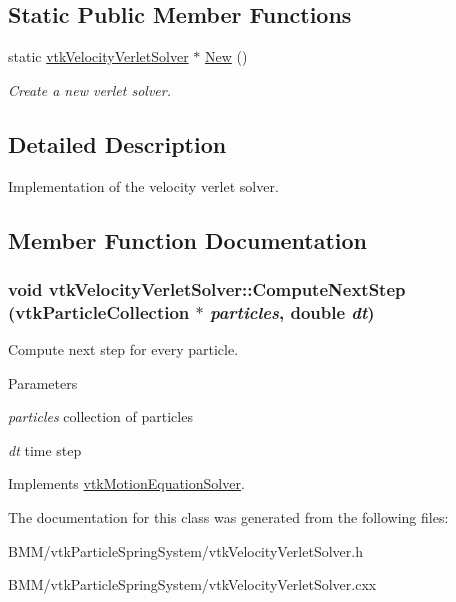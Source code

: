 \subsection*{Static Public Member Functions}
\begin{DoxyCompactItemize}
\item 
\hypertarget{classvtkVelocityVerletSolver_a72150978cba03439b19e4c0f22e43aab}{
static \hyperlink{classvtkVelocityVerletSolver}{vtkVelocityVerletSolver} $\ast$ \hyperlink{classvtkVelocityVerletSolver_a72150978cba03439b19e4c0f22e43aab}{New} ()}
\label{classvtkVelocityVerletSolver_a72150978cba03439b19e4c0f22e43aab}

\begin{DoxyCompactList}\small\item\em Create a new verlet solver. \item\end{DoxyCompactList}\end{DoxyCompactItemize}


\subsection{Detailed Description}
Implementation of the velocity verlet solver. 

\subsection{Member Function Documentation}
\hypertarget{classvtkVelocityVerletSolver_af9c28e67adeab24a3d24e73daa2e40dd}{
\subsubsection[{ComputeNextStep}]{\setlength{\rightskip}{0pt plus 5cm}void vtkVelocityVerletSolver::ComputeNextStep ({\bf vtkParticleCollection} $\ast$ {\em particles}, \/  double {\em dt})}}
\label{classvtkVelocityVerletSolver_af9c28e67adeab24a3d24e73daa2e40dd}


Compute next step for every particle. 


\begin{DoxyParams}{Parameters}
\item[{\em particles}]collection of particles \item[{\em dt}]time step \end{DoxyParams}


Implements \hyperlink{classvtkMotionEquationSolver_a1b355adf0c7ce01e51d91fd499f0c15b}{vtkMotionEquationSolver}.



The documentation for this class was generated from the following files:\begin{DoxyCompactItemize}
\item 
BMM/vtkParticleSpringSystem/vtkVelocityVerletSolver.h\item 
BMM/vtkParticleSpringSystem/vtkVelocityVerletSolver.cxx\end{DoxyCompactItemize}
